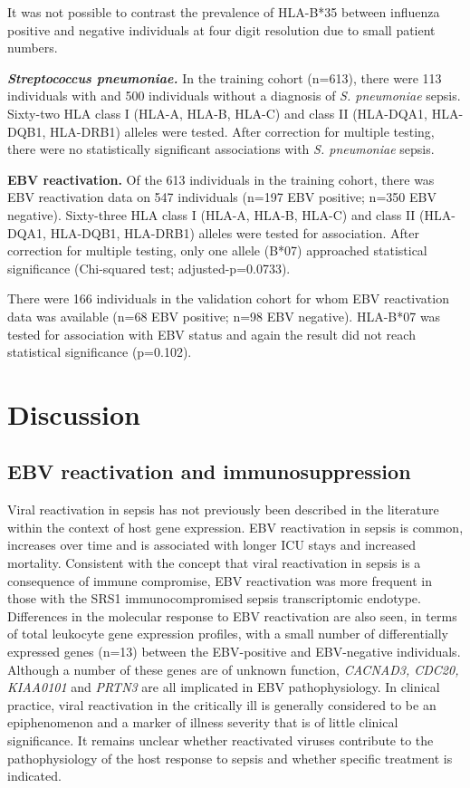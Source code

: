 It was not possible to contrast the prevalence of HLA-B*35 between influenza positive and negative individuals at four digit resolution due to small patient numbers.

\textbf{\textit{Streptococcus pneumoniae.}} In the training cohort (n=613), there were 113 individuals with and 500 individuals without a diagnosis of \textit{S. pneumoniae} sepsis. Sixty-two HLA class I (HLA-A, HLA-B, HLA-C) and class II (HLA-DQA1, HLA-DQB1, HLA-DRB1) alleles were tested. After correction for multiple testing, there were no statistically significant associations with \textit{S. pneumoniae} sepsis.

\textbf{EBV reactivation.} Of the 613 individuals in the training cohort, there was EBV reactivation data on 547 individuals (n=197 EBV positive; n=350 EBV negative). Sixty-three HLA class I (HLA-A, HLA-B, HLA-C) and class II (HLA-DQA1, HLA-DQB1, HLA-DRB1) alleles were tested for association. After correction for multiple testing, only one allele (B*07) approached statistical significance (Chi-squared test; adjusted-p=0.0733). 

There were 166 individuals in the validation cohort for whom EBV reactivation data was available (n=68 EBV positive; n=98 EBV negative). HLA-B*07 was tested for association with EBV status and again the result did not reach statistical significance (p=0.102).

\section{Discussion}
\subsection{EBV reactivation and immunosuppression}
Viral reactivation in sepsis has not previously been described in the literature within the context of host gene expression. EBV reactivation in sepsis is common, increases over time and is associated with longer ICU stays and increased mortality. Consistent with the concept that viral reactivation in sepsis is a consequence of immune compromise, EBV reactivation was more frequent in those with the SRS1 immunocompromised sepsis transcriptomic endotype. Differences in the molecular response to EBV reactivation are also seen, in terms of total leukocyte gene expression profiles, with a small number of differentially expressed genes (n=13) between the EBV-positive and EBV-negative individuals. Although a number of these genes are of unknown function, \textit{CACNAD3, CDC20, KIAA0101} and \textit{PRTN3} are all implicated in EBV pathophysiology. In clinical practice, viral reactivation in the critically ill is generally considered to be an epiphenomenon and a marker of illness severity that is of little clinical significance. It remains unclear whether reactivated viruses contribute to the pathophysiology of the host response to sepsis and whether specific treatment is indicated. 

